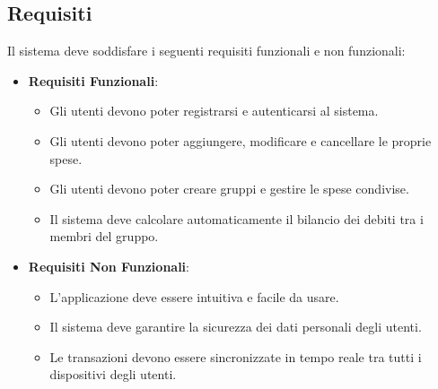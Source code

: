 \subsection{Requisiti}
Il sistema deve soddisfare i seguenti requisiti funzionali e non funzionali:
\begin{itemize}
    \item \textbf{Requisiti Funzionali}:
    \begin{itemize}
        \item Gli utenti devono poter registrarsi e autenticarsi al sistema.
        \item Gli utenti devono poter aggiungere, modificare e cancellare le proprie spese.
        \item Gli utenti devono poter creare gruppi e gestire le spese condivise.
        \item Il sistema deve calcolare automaticamente il bilancio dei debiti tra i membri del gruppo.
    \end{itemize}
    \item \textbf{Requisiti Non Funzionali}:
    \begin{itemize}
        \item L'applicazione deve essere intuitiva e facile da usare.
        \item Il sistema deve garantire la sicurezza dei dati personali degli utenti.
        \item Le transazioni devono essere sincronizzate in tempo reale tra tutti i dispositivi degli utenti.
    \end{itemize}
\end{itemize}
